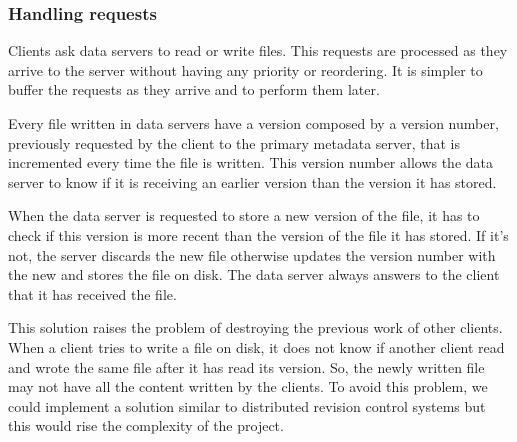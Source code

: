 \subsubsection{Handling requests}

Clients ask data servers to read or write files. This requests are
processed as they arrive to the server without having any priority or 
reordering. It is simpler to buffer the requests as they arrive and to
perform them later.

Every file written in data servers have a version composed by a version
number, previously requested by the client to the primary metadata server,
that is incremented every time the file is written. This version number allows
the data server to know if it is receiving an earlier version than the version
it has stored.

When the data server is requested to store a new version of the file, it has 
to check if this version is more recent than the version of the file it has 
stored. If it's not, the server discards the new file otherwise updates 
the version number with the new and stores the file on disk. The data server
always answers to the client that it has received the file.

This solution raises the problem of destroying the previous work of other 
clients. When a client tries to write a file on disk, it does not know if 
another client read and wrote the same file after it has read its version. 
So, the newly written file may not have all the content written by the 
clients. To avoid this problem, we could implement a solution similar to 
distributed revision control systems but this would rise the complexity 
of the project.
